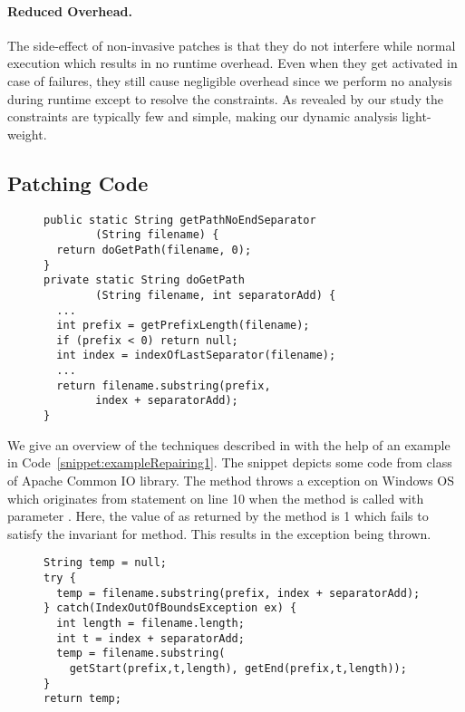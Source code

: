 \paragraph{Reduced Overhead.} The side-effect of non-invasive patches is that
they do not interfere while
normal execution which results in no runtime overhead. Even when they get
activated in case of failures,
they still cause negligible overhead since we perform no analysis during runtime
except to resolve the constraints.
As revealed by our study the constraints are typically few and simple, making
our dynamic analysis light-weight.


\subsection{Patching Code}
\label{subsec:patchingexample}
	

\begin{figure}[t]
\centering
\begin{lstlisting}
public static String getPathNoEndSeparator
        (String filename) {
  return doGetPath(filename, 0);
}
private static String doGetPath
        (String filename, int separatorAdd) {
  ...
  int prefix = getPrefixLength(filename);
  if (prefix < 0) return null;
  int index = indexOfLastSeparator(filename);
  ...
  return filename.substring(prefix,
        index + separatorAdd);
}
\end{lstlisting}
\end{figure}

We give an overview of the techniques described in 
with the help of
an example in Code~\ref{snippet:exampleRepairing1}. The snippet depicts
some code
from  class of Apache Common IO library. The method
 throws
a  exception on Windows OS which originates from
statement 
 on
line 10 when the method is called with parameter .  Here, the
value of  as
returned by the method  is 1 which fails to satisfy the
invariant
 for  method. This results
in the exception being thrown.


\begin{figure}[t]
\centering
\begin{lstlisting}
String temp = null;
try {
  temp = filename.substring(prefix, index + separatorAdd);
} catch(IndexOutOfBoundsException ex) {
  int length = filename.length;
  int t = index + separatorAdd;
  temp = filename.substring(
    getStart(prefix,t,length), getEnd(prefix,t,length));
}
return temp;
\end{lstlisting}
\end{figure}



